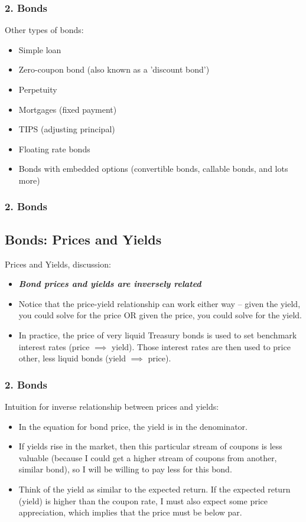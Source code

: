 \documentclass{beamer}
\begin{document}
\begin{frame}[t]
    \frametitle{2. Bonds}

    Other types of bonds:
    \begin{itemize}
        \item Simple loan
        \item Zero-coupon bond (also known as a 'discount bond')
        \item Perpetuity
        \item Mortgages (fixed payment)
        \item TIPS (adjusting principal)
        \item Floating rate bonds
        \item Bonds with embedded options (convertible bonds, callable bonds, and lots more)
    \end{itemize}

\end{frame}

\begin{frame}[t]
    \frametitle{2. Bonds}
    \subsection{Bonds: Prices and Yields}

    Prices and Yields, discussion:
    \begin{itemize}
        \item \textit{\textbf{Bond prices and yields are inversely related}}
        \item Notice that the price-yield relationship can work either way – given the yield, you could solve for the price OR given the price, you could solve for the yield.
        \item In practice, the price of very liquid Treasury bonds is used to set benchmark interest rates (price $\implies$ yield).   Those interest rates are then used to price other, less liquid bonds (yield $\implies$ price).
        
    \end{itemize}

\end{frame}

\begin{frame}[t]
    \frametitle{2. Bonds}

    Intuition for inverse relationship between prices and yields:
    \begin{itemize}
        \item In the equation for bond price, the yield is in the denominator.
        \item If yields rise in the market, then this particular stream of coupons is less valuable (because I could get a higher stream of coupons from another, similar bond), so I will be willing to pay less for this bond.
        \item Think of the yield as similar to the expected return.   If the expected return (yield) is higher than the coupon rate, I must also expect some price appreciation, which implies that the price must be below par.
    \end{itemize}

\end{frame}
\end{document}
